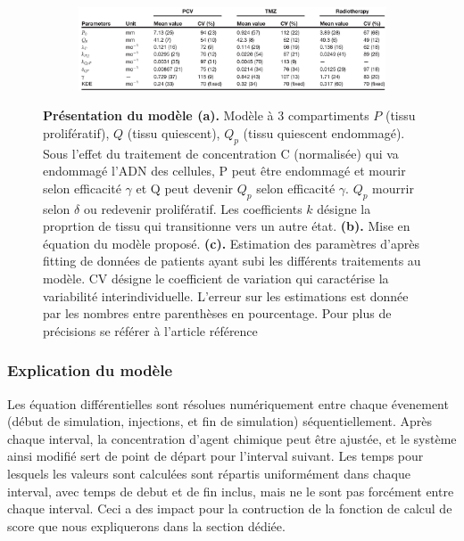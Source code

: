 \documentclass[12pt,a4paper]{article}
\begin{document}
\begin{figure}
    \vspace{1cm}
    \begin{subfigure}[t]{\textwidth}
    \centering
        \includegraphics[width=\linewidth]{Image/tableau.JPG} 
        \caption{} \label{fig:tableau}
    \end{subfigure}
    
    \caption{\textbf{Présentation du modèle \cite{} (a).} Modèle à 3 compartiments $P$ (tissu prolifératif), $Q$ (tissu quiescent), $Q_{p}$ (tissu quiescent endommagé). Sous l'effet du traitement de concentration C (normalisée) qui va endommagé l'ADN des cellules, P peut être endommagé et mourir selon efficacité $\gamma$ et Q peut devenir $Q_p$ selon efficacité $\gamma$. $Q_{p}$ mourrir selon $\delta$ ou redevenir prolifératif. Les coefficients $k$ désigne la proprtion de tissu qui transitionne vers un autre état.  \textbf{(b).} Mise en équation du modèle proposé. \textbf{(c).} Estimation des paramètres d'après fitting de données de patients ayant subi les différents traitements au modèle. CV désigne le coefficient de variation qui caractérise la variabilité interindividuelle. L'erreur sur les estimations est donnée par les nombres entre parenthèses en pourcentage. Pour plus de précisions se référer à l'article référence\cite{}}
\end{figure}

\subsubsection{Explication du modèle}
Les équation différentielles sont résolues numériquement entre chaque évenement (début de simulation, injections, et fin de simulation) séquentiellement. Après chaque interval, la concentration d'agent chimique peut être ajustée, et le système ainsi modifié sert de point de départ pour l'interval suivant. Les temps pour lesquels les valeurs sont calculées sont répartis uniformément dans chaque interval, avec temps de debut et de fin inclus, mais ne le sont pas forcément entre chaque interval. Ceci a des impact pour la contruction de la fonction de calcul de score que nous expliquerons dans la section dédiée.
\end{document}
